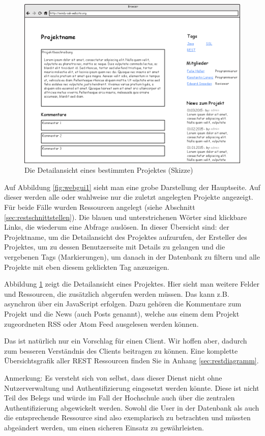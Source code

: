 \documentclass[12pt]{scrartcl}
\begin{document}
		\begin{figure}[h]
			\centering
			\includegraphics[width=0.8\linewidth]{Bilder/Projektseite.png}
			\caption[Projektseite]{Die Detailansicht eines bestimmten Projektes (Skizze)}
			\label{fig:webgui2}
		\end{figure}
		
		Auf Abbildung \ref{fig:webgui1} sieht man eine grobe Darstellung der Hauptseite. Auf dieser werden alle oder wahlweise nur die zuletzt angelegten Projekte angezeigt. Für beide Fälle wurden Ressourcen angelegt (siehe Abschnitt \ref{sec:restschnittstellen}). Die blauen und unterstrichenen Wörter sind klickbare Links, die wiederum eine Abfrage auslösen. In dieser Übersicht sind: der Projektname, um die Detailansicht des Projektes aufzurufen, der Ersteller des Projektes, um zu dessen Benutzerseite mit Details zu gelangen und die vergebenen Tags (Markierungen), um danach in der Datenbank zu filtern und alle Projekte mit eben diesem geklickten Tag anzuzeigen.
		
		Abbildung \ref{fig:webgui2} zeigt die Detailansicht eines Projektes. Hier sieht man weitere Felder und Ressourcen, die zusätzlich abgerufen werden müssen. Das kann z.B. asynchron über ein JavaScript erfolgen. Dazu gehören die Kommentare zum Projekt und die News (auch Posts genannt), welche aus einem dem Projekt zugeordneten RSS oder Atom Feed ausgelesen werden können.
		
		Das ist natürlich nur ein Vorschlag für einen Client. Wir hoffen aber, dadurch zum besseren Verständnis des Clients beitragen zu können. Eine komplette Übersichtsgrafik aller REST Ressourcen finden Sie in Anhang \ref{sec:restdiagramm}.
		
		Anmerkung: Es versteht sich von selbst, dass dieser Dienst nicht ohne Nutzerverwaltung und Authentifizierung eingesetzt werden könnte. Diese ist nicht Teil des Belegs und würde im Fall der Hochschule auch über die zentralen Authentifizierung abgewickelt werden. Sowohl die User in der Datenbank als auch die entsprechende Ressource sind also exemplarisch zu betrachten und müssten abgeändert werden, um einen sicheren Einsatz zu gewährleisten.
\end{document}
